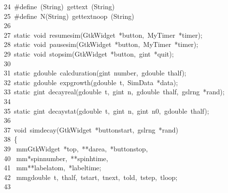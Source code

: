\documentclass[10pt,a4paper]{article}
\newcommand{\hlstd}[1]{\textcolor[rgb]{0,0,0}{#1}}
\newcommand{\hltyp}[1]{\textcolor[rgb]{0.51,0,0}{#1}}
\newcommand{\hldir}[1]{\textcolor[rgb]{0,0.51,0}{#1}}
\newcommand{\hlline}[1]{\textcolor[rgb]{0.33,0.33,0.33}{#1}}
\begin{document}
{}\hlline{\ \ 24\ }\hldir{}\hlstd{}\hldir{\#define\ \textunderscore (String)\ gettext\ (String)\\
}\hlline{\ \ 25\ }\hldir{}\hlstd{}\hldir{\#define\ N\textunderscore (String)\ gettext\textunderscore noop\ (String)\\
}\hlline{\ \ 26\ }\hldir{}\hlstd{\\
}\hlline{\ \ 27\ }\hlstd{}\hltyp{static\ void\ }\hlstd{resume\textunderscore sim(GtkWidget\ *button,\ MyTimer\ *timer);\\
}\hlline{\ \ 28\ }\hlstd{}\hltyp{static\ void\ }\hlstd{pause\textunderscore sim(GtkWidget\ *button,\ MyTimer\ *timer);\\
}\hlline{\ \ 29\ }\hlstd{}\hltyp{static\ void\ }\hlstd{stop\textunderscore sim(GtkWidget\ *button,\ gint\ *quit);\\
}\hlline{\ \ 30\ }\hlstd{\\
}\hlline{\ \ 31\ }\hlstd{}\hltyp{static\ }\hlstd{gdouble\ calc\textunderscore duration(gint\ number,\ gdouble\ thalf);\\
}\hlline{\ \ 32\ }\hlstd{}\hltyp{static\ }\hlstd{gdouble\ exp\textunderscore growth(gdouble\ t,\ SimData\ *data);\\
}\hlline{\ \ 33\ }\hlstd{}\hltyp{static\ }\hlstd{gint\ decay\textunderscore real(gdouble\ t,\ gint\ n,\ gdouble\ thalf,\ gsl\textunderscore rng\ *rand);\\
}\hlline{\ \ 34\ }\hlstd{\\
}\hlline{\ \ 35\ }\hlstd{}\hltyp{static\ }\hlstd{gint\ decay\textunderscore stat(gdouble\ t,\ gint\ n,\ gint\ n0,\ gdouble\ thalf);\\
}\hlline{\ \ 36\ }\hlstd{\\
}\hlline{\ \ 37\ }\hlstd{}\hltyp{void\ }\hlstd{sim\textunderscore decay(GtkWidget\ *button\textunderscore start,\ gsl\textunderscore rng\ *rand)\\
}\hlline{\ \ 38\ }\hlstd{\{\\
}\hlline{\ \ 39\ }\hlstd{\hlstd{ mm}GtkWidget\ *top,\ **darea,\ *button\textunderscore stop,\\
}\hlline{\ \ 40\ }\hlstd{\hlstd{ mm}*spin\textunderscore number,\ **spin\textunderscore htime,\\
}\hlline{\ \ 41\ }\hlstd{\hlstd{ mm}**label\textunderscore atom,\ *label\textunderscore time;\\
}\hlline{\ \ 42\ }\hlstd{\hlstd{ mm}gdouble\ t,\ thalf,\ tstart,\ tnext,\ told,\ tstep,\ tloop;\\
}\hlline{\ \ 43\ }\hlstd{\\
}
\end{document}
